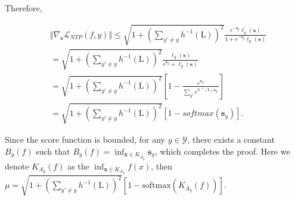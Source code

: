 Therefore,

\begin{small}
    \begin{equation}
    \begin{aligned}
  &  \Vert \nabla_{\boldsymbol{s}} \mathcal{L}_{NTP}(f, y) \Vert \! \le \! \sqrt{1 \!+\! \left( \sum_{y' \neq y} h^{-1}(\text{L}) \right)^2} \frac{e^{- \boldsymbol{s}_y} \ell_y(\boldsymbol{s}) }{1 + e^{- \boldsymbol{s}_y} \ell_y(\boldsymbol{s})} \\
    & = \sqrt{1 + \left( \sum_{y' \neq y} h^{-1}(\text{L}) \right)^2} \frac{\ell_y(\boldsymbol{s})}{e^{ \boldsymbol{s}_y} +  \ell_y(\boldsymbol{s})} \\
    & = \sqrt{1 + \left( \sum_{y' \neq y} h^{-1}(\text{L}) \right)^2} \left[ 1 - \frac{e^{ \boldsymbol{s}_y}}{ \sum_{y'} e^{ h^{-1}(\text{L}) \boldsymbol{s}_{y'}} } \right] \\
    & = \sqrt{1 + \left( \sum_{y' \neq y} h^{-1}(\text{L}) \right)^2} \left[ 1 - \textit{softmax}\left( \boldsymbol{s}_y \right) \right].
\end{aligned}
\end{equation}
\end{small}

Since the score function is bounded, for any $y \in \mathcal{Y}$, there exists a constant $B_y(f)$ such that $B_y(f) = \inf_{\boldsymbol{x} \in K_{A_y}} \boldsymbol{s}_y$, which completes the proof. Here we denote $K_{A_y}(f)$ as the $\inf_{\boldsymbol{x} \in K_{A_y}}f(x)$, then {\scriptsize $\mu=\sqrt{1 + \left( \sum_{y' \neq y} h^{-1}(\text{L}) \right)^2} \left[ 1 - \mathrm{softmax}\left( K_{A_y}(f) \right) \right]$}. 